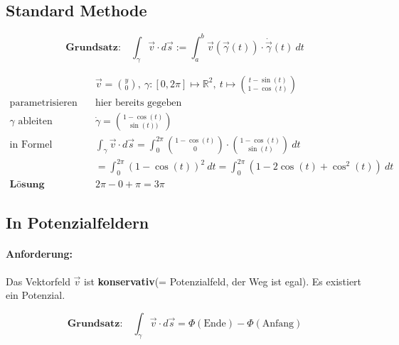 \documentclass[11pt]{article}
\begin{document}
\subsection{Standard Methode}

\begin{equation*}
	\textbf{Grundsatz:}\quad \int_\gamma \vec{v}\cdot d\vec{s} := \int_a^b \vec{v}(\vec{\gamma}(t)) \cdot \dot\vec{\gamma}(t)\ dt
\end{equation*}

\begin{equation*}
\begin{split}
	& \vec{v} = \binom{y}{0},\ \gamma:[0, 2\pi] \mapsto \mathbb{R}^2,\ t \mapsto \binom{t -\sin(t)}{1-\cos(t)} \\
	\text{parametrisieren}\quad & \text{hier bereits gegeben} \\
	\text{$\gamma$ ableiten}\quad & \dot\gamma = \binom{1-\cos(t)}{\sin(t))} \\
	\text{in Formel einsetzen}\quad & \int_\gamma \vec{v} \cdot d\vec{s} = \int_0^{2\pi} \binom{1-\cos(t)}{0}\cdot\binom{1-\cos(t)}{\sin(t)}\ dt \\
	&= \int_0^{2\pi} (1-\cos(t))^2\ dt = \int_0^{2\pi} (1-2\cos(t)+\cos^2(t))\ dt \\
	\textbf{L{\"o}sung}\quad & 2\pi - 0 + \pi = 3\pi
\end{split}
\end{equation*}

\subsection{In Potenzialfeldern}

\paragraph{Anforderung:} Das Vektorfeld $\vec{v}$ ist \textbf{konservativ}(= Potenzialfeld, der Weg ist egal). Es existiert ein Potenzial.

\begin{equation*}
	\textbf{Grundsatz:}\quad\int_\gamma \vec{v} \cdot d\vec{s} = \Phi(\text{Ende}) - \Phi(\text{Anfang})
\end{equation*}
\end{document}
